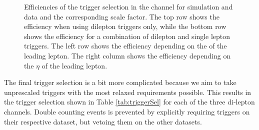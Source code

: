 \begin{figure}[htbp!]
\begin{center}
      \caption{Efficiencies of the trigger selection in the \emu channel for simulation and data and the corresponding scale factor. The top row shows the efficiency when using dilepton triggers only, while the bottom row shows
      the efficiency for a combination of dilepton and single lepton triggers. The left row shows the efficiency depending on the \pt of the leading lepton. The right column shows the efficiency depending on the $\eta$ of the leading lepton. }  
       \label{fig:TriggerSel}
  \end{center}
\end{figure}


The final trigger selection is a bit more complicated because we aim to take unprescaled triggers with the most relaxed requirements possible.
This results in the trigger selection shown in Table \ref{tab:triggerSel} for each of the three di-lepton channels.
Double counting events is prevented by explicitly requiring triggers on their respective dataset, but vetoing them on the other datasets.

